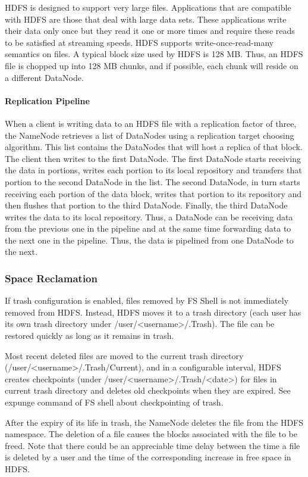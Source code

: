 \documentclass{article}
\begin{document}
HDFS is designed to support very large files. Applications that are compatible with HDFS are those that deal with large data sets. These applications write their data only once but they read it one or more times and require these reads to be satisfied at streaming speeds. HDFS supports write-once-read-many semantics on files. A typical block size used by HDFS is 128 MB. Thus, an HDFS file is chopped up into 128 MB chunks, and if possible, each chunk will reside on a different DataNode.

\paragraph{Replication Pipeline} When a client is writing data to an HDFS file with a replication factor of three, the NameNode retrieves a list of DataNodes using a replication target choosing algorithm. This list contains the DataNodes that will host a replica of that block. The client then writes to the first DataNode. The first DataNode starts receiving the data in portions, writes each portion to its local repository and transfers that portion to the second DataNode in the list. The second DataNode, in turn starts receiving each portion of the data block, writes that portion to its repository and then flushes that portion to the third DataNode. Finally, the third DataNode writes the data to its local repository. Thus, a DataNode can be receiving data from the previous one in the pipeline and at the same time forwarding data to the next one in the pipeline. Thus, the data is pipelined from one DataNode to the next.

\subsubsection{Space Reclamation}
If trash configuration is enabled, files removed by FS Shell is not immediately removed from HDFS. Instead, HDFS moves it to a trash directory (each user has its own trash directory under /user/<username>/.Trash). The file can be restored quickly as long as it remains in trash.

Most recent deleted files are moved to the current trash directory (/user/<username>/.Trash/Current), and in a configurable interval, HDFS creates checkpoints (under /user/<username>/.Trash/<date>) for files in current trash directory and deletes old checkpoints when they are expired. See expunge command of FS shell about checkpointing of trash.

After the expiry of its life in trash, the NameNode deletes the file from the HDFS namespace. The deletion of a file causes the blocks associated with the file to be freed. Note that there could be an appreciable time delay between the time a file is deleted by a user and the time of the corresponding increase in free space in HDFS.
\end{document}
